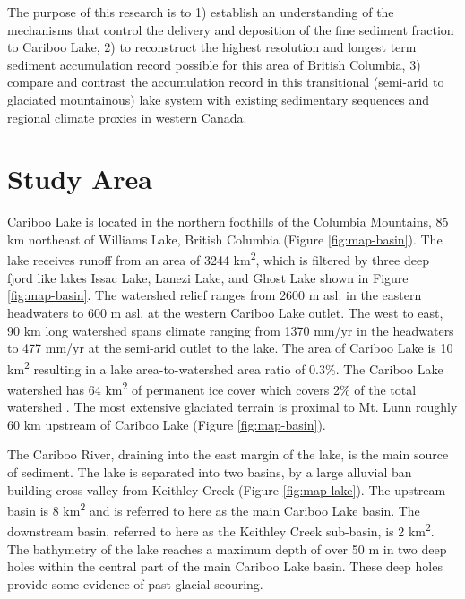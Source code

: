\documentclass[Royal,times,doublespace,sageh]{sagej}
\begin{document}
The purpose of this research is to 1) establish an understanding of the
mechanisms that control the delivery and deposition of the fine sediment
fraction to Cariboo Lake, 2) to reconstruct the highest resolution and
longest term sediment accumulation record possible for this area of
British Columbia, 3) compare and contrast the accumulation record in
this transitional (semi-arid to glaciated mountainous) lake system with
existing sedimentary sequences and regional climate proxies in western
Canada.

\hypertarget{study-area}{%
\section{Study Area}\label{study-area}}

Cariboo Lake is located in the northern foothills of the Columbia
Mountains, 85 km northeast of Williams Lake, British Columbia (Figure
\ref{fig:map-basin}). The lake receives runoff from an area of 3244
km\textsuperscript{2}, which is filtered by three deep fjord like lakes
Issac Lake, Lanezi Lake, and Ghost Lake shown in Figure
\ref{fig:map-basin}. The watershed relief ranges from 2600 m asl. in the
eastern headwaters to 600 m asl. at the western Cariboo Lake outlet. The
west to east, 90 km long watershed spans climate ranging from 1370 mm/yr
in the headwaters to 477 mm/yr at the semi-arid outlet to the lake. The
area of Cariboo Lake is 10 km\textsuperscript{2} resulting in a lake
area-to-watershed area ratio of 0.3\%. The Cariboo Lake watershed has 64
km\textsuperscript{2} of permanent ice cover which covers 2\% of the
total watershed \citep{Bolch2008}. The most extensive glaciated terrain
is proximal to Mt. Lunn roughly 60 km upstream of Cariboo Lake (Figure
\ref{fig:map-basin}).

The Cariboo River, draining into the east margin of the lake, is the
main source of sediment. The lake is separated into two basins, by a
large alluvial ban building cross-valley from Keithley Creek (Figure
\ref{fig:map-lake}). The upstream basin is 8 km\textsuperscript{2} and
is referred to here as the main Cariboo Lake basin. The downstream
basin, referred to here as the Keithley Creek sub-basin, is 2
km\textsuperscript{2}. The bathymetry of the lake reaches a maximum
depth of over 50 m in two deep holes within the central part of the main
Cariboo Lake basin. These deep holes provide some evidence of past
glacial scouring.
\end{document}
